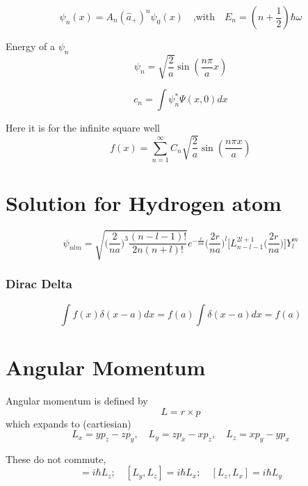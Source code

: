 \begin{equation}
  \psi_{n}(x)=A_{n}(\hat{a}_{+})^{n}\psi_0(x)\quad\text{,with}\quad E_{n}=(n+\frac{1}{2})\hbar\omega
\end{equation}


Energy of a $ \psi_{n} $ 
\begin{equation}
  \psi_{n}=\sqrt{\frac{2}{a}}\sin(\frac{n \pi}{a}x)
\end{equation}

  \begin{equation}
    c_{n}=\int\psi_{n}^{*}\Psi(x,0)dx
  \end{equation}
  


Here it is for the infinite square well
\begin{equation}
  f(x)=\sum_{n=1}^{\infty}C_{n}\sqrt{\frac{2}{a}}\sin(\frac{n \pi x}{a})
\end{equation}

\section{Solution for Hydrogen atom}
\begin{equation}
  \psi_{nlm}=\sqrt{\bigg(\frac{2}{na}\bigg)^{3}\frac{(n-l-1)!}{2n(n+l)!}}e^{-\frac{r}{na}}\bigg(\frac{2r}{na}\bigg)^{l}\big[L^{2l+1}_{n-l-1}\big(\frac{2r}{na}\big)\big]Y^{m}_{l}
\end{equation}


\subsubsection{Dirac Delta}
\begin{equation}
  \int f(x)\delta(x-a)dx=f(a)\int\delta(x-a)dx=f(a)
\end{equation}


\section{Angular Momentum}
Angular momentum is defined by
\begin{equation}
  L=r \times p
\end{equation}
which expands to (cartiesian)
\begin{equation}
  L_{x}=yp_{z}-zp_{y},\quad L_{y}=zp_{x}-xp_{z},\quad L_{z}=xp_{y}-yp_{x}
\end{equation}

These do not commute,
\begin{equation}
  [L_{x},L_{y}]=i \hbar L_{z};\quad [L_{y},L_{z}]=i \hbar L_{x};\quad [L_{z},L_{x}]=i \hbar L_{y}
\end{equation}

